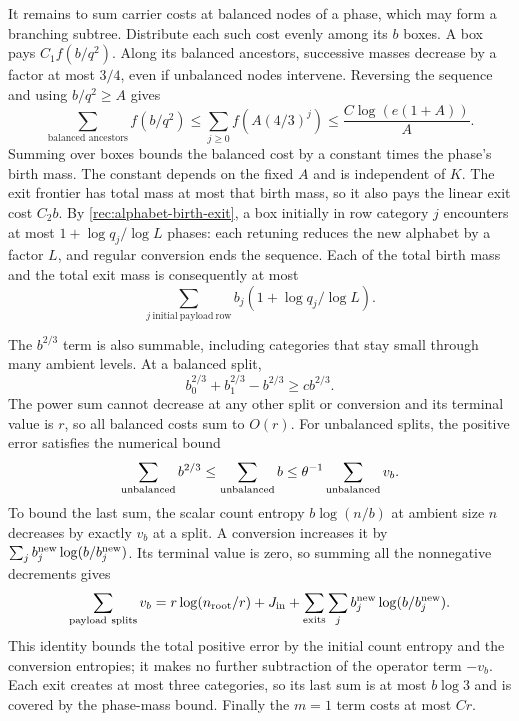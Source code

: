 It remains to sum carrier costs at balanced nodes of a phase, which
may form a branching subtree.  Distribute each such cost evenly among
its $b$ boxes.  A box pays $C_1f(b/q^2)$.  Along its balanced ancestors,
successive masses decrease by a factor at most $3/4$, even if
unbalanced nodes intervene.  Reversing the sequence and using
$b/q^2\ge A$ gives
\[
 \sum_{\text{balanced ancestors}}f(b/q^2)
 \le\sum_{j\ge0}f(A(4/3)^j)
 \le \frac{C\log(e(1+A))}{A}.
\]
Summing over boxes bounds the balanced cost by a constant times the
phase's birth mass.  The constant depends on the fixed $A$ and is
independent of $K$.  The exit frontier has total mass at most that
birth mass, so it also pays the linear exit cost $C_2b$.
By \eqref{rec:alphabet-birth-exit}, a box initially in row category
$j$ encounters at most $1+\log q_j/\log L$ phases: each retuning
reduces the new alphabet by a factor $L$, and regular conversion ends
the sequence.  Each of the total birth mass and the total exit mass
is consequently at most
\[
 \sum_{j\ \mathrm{initial\ payload\ row}}b_j
             (1+\log q_j/\log L).
\]

The $b^{2/3}$ term is also summable, including categories that stay
small through many ambient levels.  At a balanced split,
\[
 b_0^{2/3}+b_1^{2/3}-b^{2/3}\ge c b^{2/3}.
\]
The power sum cannot decrease at any other split or conversion and its
terminal value is $r$, so all balanced costs sum to $O(r)$.
For unbalanced splits, the positive error satisfies the numerical bound
\[
 \sum_{\rm unbalanced}b^{2/3}
 \le\sum_{\rm unbalanced}b
 \le\theta^{-1}\sum_{\rm unbalanced}v_b.
\]
To bound the last sum, the scalar count entropy $b\log(n/b)$ at
ambient size $n$ decreases by exactly $v_b$ at a split.  A conversion
increases it by $\sum_j b_j^{\rm new}\log(b/b_j^{\rm new})$.
Its terminal value is zero, so summing all the nonnegative decrements
gives
\begin{equation}\label{rec:alphabet-count-telescope}
 \sum_{\mathrm{payload\ splits}}v_b
 =r\log(n_{\rm root}/r)+J_{\rm in}
 +\sum_{\rm exits}\sum_j b_j^{\rm new}\log(b/b_j^{\rm new}).
\end{equation}
This identity bounds the total positive error by the initial count
entropy and the conversion entropies; it makes no further subtraction
of the operator term $-v_b$.  Each exit creates at most three categories,
so its last sum is at most $b\log3$ and is covered by the phase-mass
bound.  Finally the $m=1$
term costs at most $Cr$.

